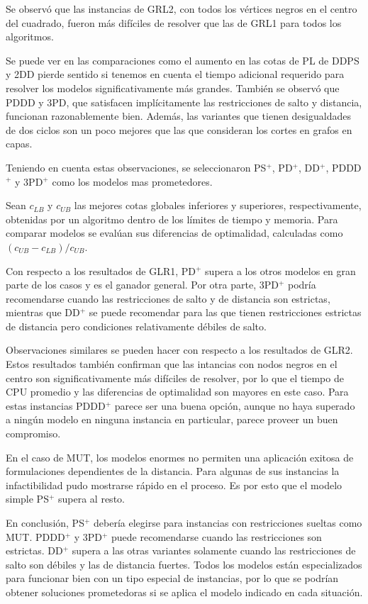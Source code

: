 \documentclass[10pt, a4paper]{article}
\theoremstyle{definition}
\begin{document}
Se observó que las instancias de GRL2, con todos los vértices negros en el centro del cuadrado, fueron más difíciles de resolver que las de GRL1 para todos los algoritmos.

Se puede ver en las comparaciones como el aumento en las cotas de PL de DDPS y 2DD pierde sentido si tenemos en cuenta el tiempo adicional requerido para resolver los modelos significativamente más grandes. También se observó que PDDD y 3PD, que satisfacen implícitamente las restricciones de salto y distancia, funcionan razonablemente bien. Además, las variantes que tienen desigualdades de dos ciclos son un poco mejores que las que consideran los cortes en grafos en capas.

Teniendo en cuenta estas observaciones, se seleccionaron PS$^{+}$, PD$^{+}$, DD$^{+}$, PDDD$^{+}$ y 3PD$^{+}$ como los modelos mas prometedores.

Sean $c_{LB}$ y $c_{UB}$ las mejores cotas globales inferiores y superiores, respectivamente, obtenidas por un algoritmo dentro de los límites de tiempo y memoria. Para comparar modelos se evalúan sus diferencias de optimalidad, calculadas como $(c_{UB} - c_{LB})/c_{UB}$.

Con respecto a los resultados de GLR1, PD$^{+}$ supera a los otros modelos en gran parte de los casos y es el ganador general. Por otra parte, 3PD$^{+}$ podría recomendarse cuando las restricciones de salto y de distancia son estrictas, mientras que DD$^{+}$ se puede recomendar para las que tienen restricciones estrictas de distancia pero condiciones relativamente débiles de salto.

Observaciones similares se pueden hacer con respecto a los resultados de GLR2. Estos resultados también confirman que las intancias con nodos negros en el centro son significativamente más difíciles de resolver, por lo que el tiempo de CPU promedio y las diferencias de optimalidad son mayores en este caso. Para estas instancias PDDD$^{+}$ parece ser una buena opción, aunque no haya superado a ningún modelo en ninguna instancia en particular, parece proveer un buen compromiso.

En el caso de MUT, los modelos enormes no permiten una aplicación exitosa de formulaciones dependientes de la distancia. Para algunas de sus instancias la infactibilidad pudo mostrarse rápido en el proceso. Es por esto que el modelo simple PS$^{+}$ supera al resto.

En conclusión, PS$^{+}$ debería elegirse para instancias con restricciones sueltas como MUT. PDDD$^{+}$ y 3PD$^{+}$ puede recomendarse cuando las restricciones son estrictas. DD$^{+}$ supera a las otras variantes solamente cuando las restricciones de salto son débiles y las de distancia fuertes. Todos los modelos están especializados para funcionar bien con un tipo especial de instancias, por lo que se podrían obtener soluciones prometedoras si se aplica el modelo indicado en cada situación.
\end{document}
